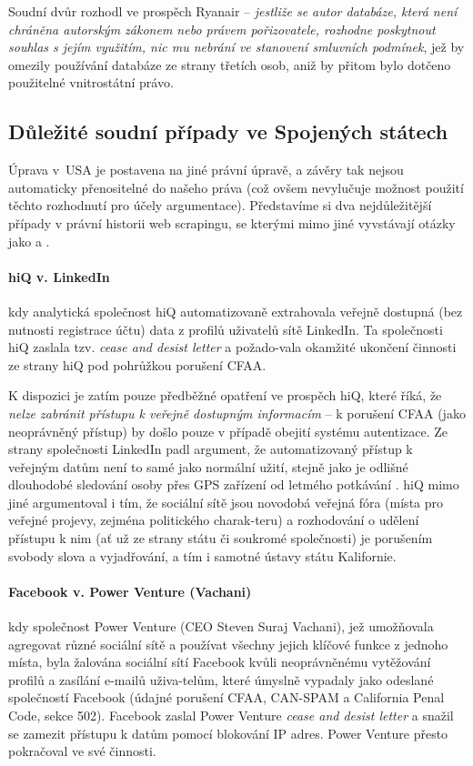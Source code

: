 \documentclass[thesis=B,czech]{FITthesis}[2012/06/26]
\begin{document}
Soudní dvůr rozhodl ve prospěch Ryanair -- \emph{jestliže se autor databáze, která není chráněna autorským zákonem nebo právem pořizovatele, rozhodne poskytnout souhlas s jejím využitím, nic mu nebrání ve stanovení smluvních podmínek}, jež by omezily používání databáze ze strany třetích osob, aniž by přitom bylo dotčeno použitelné vnitrostátní právo.\cite{C-30/14}

\subsection{Důležité soudní případy ve Spojených státech}
Úprava v USA je postavena na jiné právní úpravě, a závěry tak nejsou automaticky přenositelné do našeho práva (což ovšem nevylučuje možnost použití těchto rozhodnutí pro účely argumentace). Představíme si dva nejdůležitější případy v právní historii web scrapingu, se kterými mimo jiné vyvstávají otázky jako  a .

\paragraph{hiQ v. LinkedIn} kdy analytická společnost hiQ automatizovaně extrahovala veřejně dostupná (bez nutnosti registrace účtu) data z profilů uživatelů sítě LinkedIn. Ta společnosti hiQ zaslala tzv. \textit{cease and desist letter} a požado-vala okamžité ukončení činnosti ze strany hiQ pod pohrůžkou porušení CFAA. \cite{hiq_linkedin_1}

K dispozici je zatím pouze předběžné opatření ve prospěch hiQ, které říká, že \textit{nelze zabránit přístupu k veřejně dostupným informacím} -- k porušení CFAA (jako neoprávněný přístup) by došlo pouze v případě obejití systému autentizace. Ze strany společnosti LinkedIn padl argument, že automatizovaný přístup k veřejným datům není to samé jako normální  užití, stejně jako je odlišné dlouhodobé sledování osoby přes GPS zařízení od letmého potkávání \cite{linkedin_arg}. hiQ mimo jiné argumentoval i tím, že sociální sítě jsou novodobá veřejná fóra (místa pro veřejné projevy, zejména politického charak-teru\cite{public_forum}) a rozhodování o udělení přístupu k nim (ať už ze strany státu či soukromé společnosti) je porušením svobody slova a vyjadřování, a tím i samotné ústavy státu Kalifornie.\cite{hiq_linkedin_2}

\paragraph{Facebook v. Power Venture (Vachani)} kdy společnost Power Venture (CEO Steven Suraj Vachani), jež umožňovala agregovat různé sociální sítě a používat všechny jejich klíčové funkce z jednoho místa, byla žalována sociální sítí Facebook kvůli neoprávněnému vytěžování profilů a zasílání e-mailů uživa-telům, které úmyslně vypadaly jako odeslané společností Facebook (údajné porušení CFAA, CAN-SPAM a California Penal Code, sekce 502). Facebook zaslal Power Venture \textit{cease and desist letter} a snažil se zamezit přístupu k datům pomocí blokování IP adres. Power Venture přesto pokračoval ve své činnosti.\cite{facebook_venture_1}
\end{document}
